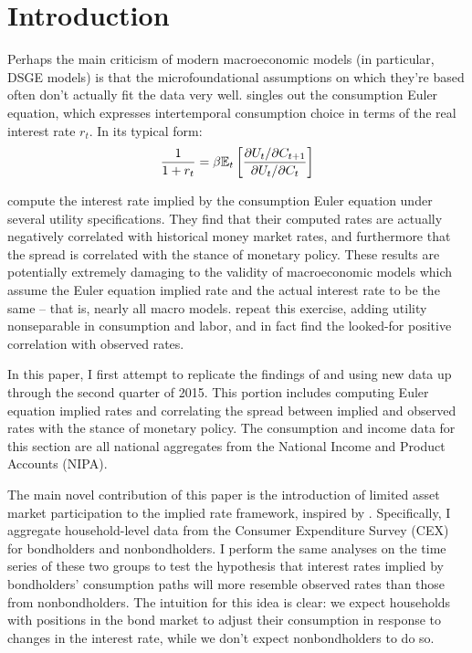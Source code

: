 \section{Introduction}
Perhaps the main criticism of modern macroeconomic models (in particular, DSGE models) is that the microfoundational assumptions on which they're based often don't actually fit the data very well. \cite{smith14} singles out the consumption Euler equation, which expresses intertemporal consumption choice in terms of the real interest rate $r_t$. In its typical form: $$\frac{1}{1 + r_t} = \beta \mathbb{E}_t \left[  \frac{\partial U_t / \partial C_{t+1}}{\partial U_t / \partial C_t}  \right]$$

\cite{canzoneri07} compute the interest rate implied by the consumption Euler equation under several utility specifications. They find that their computed rates are actually negatively correlated with historical money market rates, and furthermore that the spread is correlated with the stance of monetary policy. These results are potentially extremely damaging to the validity of macroeconomic models which assume the Euler equation implied rate and the actual interest rate to be the same -- that is, nearly all macro models. \cite{collard11} repeat this exercise, adding utility nonseparable in consumption and labor, and in fact find the looked-for positive correlation with observed rates.

In this paper, I first attempt to replicate the findings of \cite{canzoneri07} and \cite{collard11} using new data up through the second quarter of 2015.  This portion includes computing Euler equation implied rates and correlating the spread between implied and observed rates with the stance of monetary policy. The consumption and income data for this section are all national aggregates from the National Income and Product Accounts (NIPA).

The main novel contribution of this paper is the introduction of limited asset market participation to the implied rate framework, inspired by \cite{vissing02}. Specifically, I aggregate household-level data from the Consumer Expenditure Survey (CEX) for bondholders and nonbondholders. I perform the same analyses on the time series of these two groups to test the hypothesis that interest rates implied by bondholders' consumption paths will more resemble observed rates than those from nonbondholders. The intuition for this idea is clear: we expect households with positions in the bond market to adjust their consumption in response to changes in the interest rate, while we don't expect nonbondholders to do so.

